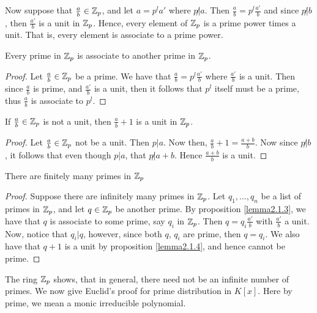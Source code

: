 Now suppose that $\frac{a}{b} \in \mathbb{Z}_p$, and let $a=p^la'$ where $p \not|a$. Then $\frac{a}{b}=p^l\frac{a'}{b}$ and since $p \not| b$, then $\frac{a'}{b}$ is a unit in $\mathbb{Z}_p$. Hence, every element of $\mathbb{Z}_p$ is a prime power times a unit. That is, every element is associate to a prime power.

\begin{lemma}\label{lemma2.1.3}
    Every prime in $\mathbb{Z}_p$ is associate to another prime in $\mathbb{Z}_p$.
\end{lemma}
\begin{proof}
    Let $\frac{a}{b} \in \mathbb{Z}_p$ be a prime. We have that $\frac{a}{b}=p^l\frac{a'}{b}$ where $\frac{a'}{b}$ is a unit. Then since $\frac{a}{b}$ is prime, and $\frac{a'}{b}$ is a unit, then it follows that $p^l$ itself must be a prime, thus $\frac{a}{b}$ is associate to $p^l$. 
\end{proof}

\begin{lemma}\label{lemma2.1.4}
    If $\frac{a}{b} \in \mathbb{Z}_p$ is not a unit, then $\frac{a}{b}+1$ is a unit in $\mathbb{Z}_p$. 
\end{lemma}
\begin{proof}
    Let $\frac{a}{b} \in \mathbb{Z}_p$ not be a unit. Then $p|a$. Now then, $\frac{a}{b}+1=\frac{a+b}{b}$. Now since $p \not| b$, it follows that even though $p|a$, that $p \not| a+b$. Hence $\frac{a+b}{b}$ is a unit.
\end{proof}

\begin{theorem}\label{theorem2.1.5}
    There are finitely many primes in $\mathbb{Z}_p$
\end{theorem}
\begin{proof}
    Suppose there are infinitely many primes in $\mathbb{Z}_p$. Let $q_1, \dots, q_n$ be a list of primes in $\mathbb{Z}_p$, and let $q \in \mathbb{Z}_p$ be another prime. By proposition \ref{lemma2.1.3}, we have that $q$ is associate to some prime, say $q_i$ in $\mathbb{Z}_p$. Then $q=q_i\frac{a'}{b}$ with $\frac{a'}{b}$ a unit. Now, notice that $q_i|q$, however, since both $q$, $q_i$ are prime, then $q=q_i$. We also have that $q+1$ is a unit by proposition \ref{lemma2.1.4}, and hence cannot be prime.
\end{proof}

The ring $\mathbb{Z}_p$ shows, that in general, there need not be an infinite number of primes. We now give Euclid's proof for prime distribution in $K[x]$. Here by prime, we mean a monic irreducible polynomial.

